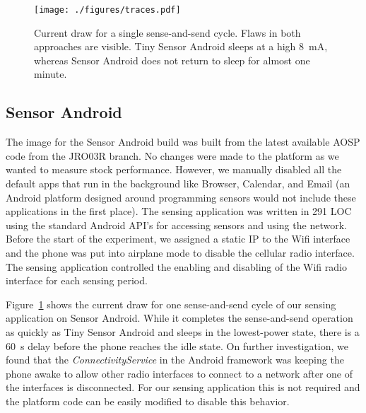 \begin{figure}[t]
\texttt{[image: ./figures/traces.pdf]}

\caption{\small Current draw for a single sense-and-send cycle.
\textnormal{Flaws in both approaches are visible. Tiny Sensor Android sleeps
at a high 8~mA, whereas Sensor Android does not return to sleep for almost
one minute.}}

\label{fig-traces}
\end{figure}


\subsection{Sensor Android}
\label{subsec-full}

The image for the Sensor Android build was built from the latest available
AOSP code from the JRO03R branch. No changes were made to the platform as we
wanted to measure stock performance. However, we manually disabled all the
default apps that run in the background like Browser, Calendar, and Email 
(an Android platform designed around
programming sensors would not include these applications in the first place).
The sensing application was written in 291 LOC using the standard Android
API's for accessing sensors and using the network. Before the start of the
experiment, we assigned a static IP to the Wifi interface and the phone was
put into airplane mode to disable the cellular radio interface. The sensing
application controlled the enabling and disabling of the Wifi radio interface
for each sensing period.

Figure~\ref{fig-traces} shows the current draw for one sense-and-send cycle
of our sensing application on Sensor Android. While it completes the
sense-and-send operation as quickly as Tiny Sensor Android and sleeps in the
lowest-power state, there is a 60~s delay before the phone reaches the idle
state. On further investigation, we found that the
\textit{ConnectivityService} in the Android framework was keeping the phone
awake to allow other radio interfaces to connect to a network after one of
the interfaces is disconnected. For our sensing application this is not
required and the platform code can be easily modified to disable this
behavior.

